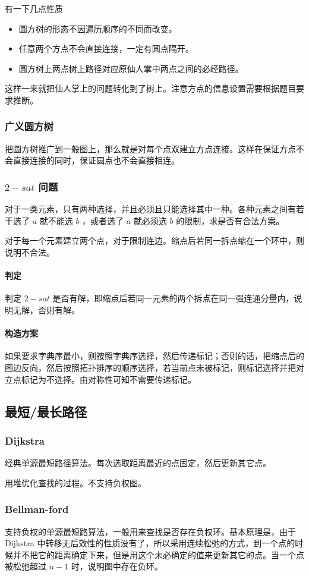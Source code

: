 \documentclass[UTF-8]{ctexart}
\begin{document}
				有一下几点性质
				\begin{itemize}
					\item 圆方树的形态不因遍历顺序的不同而改变。
					\item 任意两个方点不会直接连接，一定有圆点隔开。
					\item 圆方树上两点树上路径对应原仙人掌中两点之间的必经路径。
				\end{itemize}
				这样一来就把仙人掌上的问题转化到了树上。注意方点的信息设置需要根据题目要求推断。
				\subsubsection{广义圆方树}
				把圆方树推广到一般图上，那么就是对每个点双建立方点连接。这样在保证方点不会直接连接的同时，保证圆点也不会直接相连。
				\subsubsection{$2-sat$ 问题}
				对于一类元素，只有两种选择，并且必须且只能选择其中一种。各种元素之间有若干选了 $a$ 就不能选 $b$ ，或者选了 $a$ 就必须选 $b$ 的限制，求是否有合法方案。
				
				对于每一个元素建立两个点，对于限制连边。缩点后若同一拆点缩在一个环中，则说明不合法。
				\paragraph{判定}判定 $2-sat$ 是否有解，即缩点后若同一元素的两个拆点在同一强连通分量内，说明无解，否则有解。
				\paragraph{构造方案} 如果要求字典序最小，则按照字典序选择，然后传递标记；否则的话，把缩点后的图边反向，然后按照拓扑排序的顺序选择，若当前点未被标记，则标记选择并把对立点标记为不选择。由对称性可知不需要传递标记。
			\subsection{最短/最长路径}
				\subsubsection{Dijkstra}
				经典单源最短路径算法。每次选取距离最近的点固定，然后更新其它点。
				
				用堆优化查找的过程。不支持负权图。
				\subsubsection{Bellman-ford}
				支持负权的单源最短路算法，一般用来查找是否存在负权环。基本原理是，由于 Dijkstra 中转移无后效性的性质没有了，所以采用连续松弛的方式，到一个点的时候并不把它的距离确定下来，但是用这个未必确定的值来更新其它的点。当一个点被松弛超过 $n-1$ 时，说明图中存在负环。
				
\end{document}
